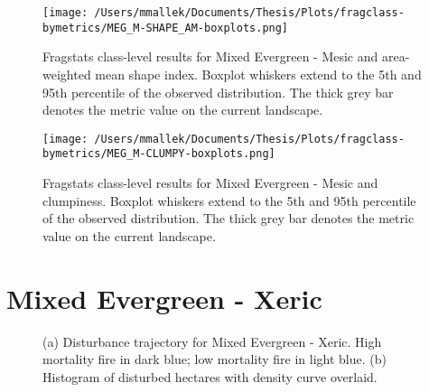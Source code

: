 \begin{figure}[!htbp]
\centering
    \texttt{[image: /Users/mmallek/Documents/Thesis/Plots/fragclass-bymetrics/MEG\_M-SHAPE\_AM-boxplots.png]}
  \caption{Fragstats class-level results for Mixed Evergreen - Mesic and area-weighted mean shape index. Boxplot whiskers extend to the 5th and 95th percentile of the observed distribution. The thick grey bar denotes the metric value on the current landscape.}
  \label{fig:megm_shapeam}
\end{figure}


\begin{figure}[!htbp]
\centering
    \texttt{[image: /Users/mmallek/Documents/Thesis/Plots/fragclass-bymetrics/MEG\_M-CLUMPY-boxplots.png]}
  \caption{Fragstats class-level results for Mixed Evergreen - Mesic and clumpiness. Boxplot whiskers extend to the 5th and 95th percentile of the observed distribution. The thick grey bar denotes the metric value on the current landscape.}
  \label{fig:megm_clumpy}
\end{figure}


\clearpage
\section{Mixed Evergreen - Xeric} 

\begin{figure}[!htbp]
  \centering
  \caption{\small (a) Disturbance trajectory for Mixed Evergreen - Xeric. High mortality fire in dark blue; low mortality fire in light blue. (b) Histogram of disturbed hectares with density curve overlaid.} 
  \label{fig:darea_megx}
\end{figure}


